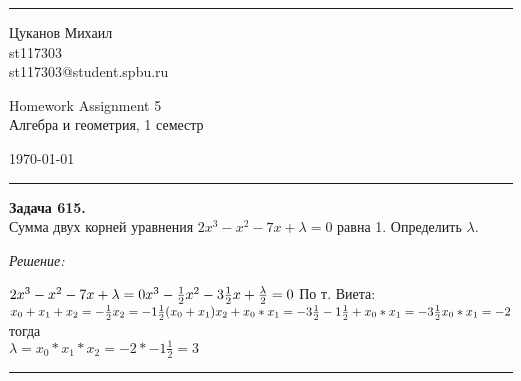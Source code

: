 \documentclass[a4paper, 12pt]{article}
\newenvironment{problem}[2][Задача]
    { \begin{mdframed}[backgroundcolor=gray!10] \textbf{#1 #2.} \\}
    {  \end{mdframed}}
\newenvironment{solution}
    {\textit{Решение: }}
    {\noindent\rule{7in}{1.5pt}}
\begin{document}

\fancyhead[C]{}
\hrule \medskip %
\begin{minipage}{0.295\textwidth} 
\raggedright\footnotesize
Цуканов Михаил \hfill\\   
st117303 \hfill\\
st117303@student.spbu.ru
\end{minipage}
\begin{minipage}{0.4\textwidth} 
\centering\large 
Homework Assignment 5\\ 
\normalsize 
Алгебра и геометрия, 1 семестр\\ 
\end{minipage}
\begin{minipage}{0.295\textwidth} 
\raggedleft
\today\hfill\\
\end{minipage}
\medskip\hrule 
\bigskip




\begin{problem}{615}
Сумма двух корней уравнения $2x^3-x^2-7x+\lambda=0$ равна 1. Определить $\lambda$.
\end{problem}
\begin{solution}

$
2x^3-x^2-7x+\lambda=0 \\
x^3-\frac{1}{2}x^2-3\frac{1}{2}x+\frac{\lambda}{2}=0 \\
\\
$
По т. Виета: \\
$
x_0 + x_1 + x_2 = -\frac{1}{2} \\
x_2 = -1\frac{1}{2} \\
\\
(x_0 + x_1)x_2 + x_0*x_1 = -3\frac{1}{2} \\
-1\frac{1}{2} + x_0*x_1 = -3\frac{1}{2} \\
x_0*x_1 = -2 \\
\\
$
тогда \\
$
\lambda = x_0*x_1*x_2 = -2 * -1\frac{1}{2} = 3
$

\end{solution} 
\end{document}
